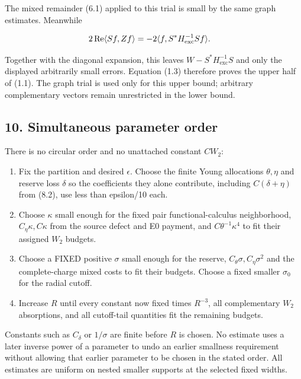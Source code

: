 The mixed remainder (6.1) applied to this trial is small by the same
graph estimates. Meanwhile

\begin{gather*}
\begin{aligned}
& 2\operatorname{Re} \langle Sf,Zf\rangle =-2\langle f,S^{*}H_{\mathrm{exc}}^{-1}Sf\rangle .
\end{aligned}\notag
\end{gather*}

Together with the diagonal expansion, this leaves
\(W-S^{*}H_{\mathrm{exc}}^{-1}S\) and only the displayed arbitrarily
small errors. Equation (1.3) therefore proves the upper half of (1.1).
The graph trial is used only for this upper bound; arbitrary
complementary vectors remain unrestricted in the lower bound.

\subsection{10. Simultaneous parameter
order}\label{i-simultaneous-parameter-order}

There is no circular order and no unattached constant \(C W_{2}\):

\begin{enumerate}
\def\labelenumi{\arabic{enumi}.}
\tightlist
\item
  Fix the partition and desired \(\epsilon\). Choose the finite Young
  allocations \(\theta , \eta\) and reserve loss \(\delta\) so the
  coefficients they alone contribute, including \(C(\delta +\eta )\)
  from (8.2), use less than epsilon/10 each.
\item
  Choose \(\kappa\) small enough for the fixed pair functional-calculus
  neighborhood, \(C_{\eta} \kappa , C \kappa\) from the source defect
  and E0 payment, and \(C \theta ^{-1}\kappa ^{4}\) to fit their
  assigned \(W_{2}\) budgets.
\item
  Choose a FIXED positive \(\sigma\) small enough for the reserve,
  \(C_{\theta} \sigma , C_{\eta} \sigma ^{2}\) and the complete-charge
  mixed costs to fit their budgets. Choose a fixed smaller
  \(\sigma _{0}\) for the radial cutoff.
\item
  Increase \(R\) until every constant now fixed times \(R^{-3}\), all
  complementary \(W_{2}\) absorptions, and all cutoff-tail quantities
  fit the remaining budgets.
\end{enumerate}

Constants such as \(C_{\delta}\) or \(1/\sigma\) are finite before \(R\)
is chosen. No estimate uses a later inverse power of a parameter to undo
an earlier smallness requirement without allowing that earlier parameter
to be chosen in the stated order. All estimates are uniform on nested
smaller supports at the selected fixed widths.

